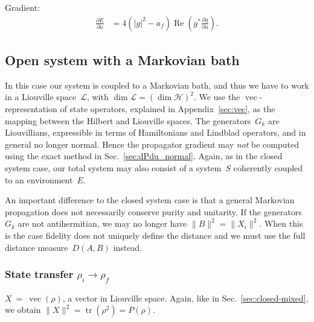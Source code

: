 \documentclass[aps, pra, a4paper, longbibliography, superscriptaddress]{revtex4-1}
\newcommand{\I}{\openone}
\newcommand{\be}{\begin{equation}}
\newcommand{\ee}{\end{equation}}
\newcommand{\eq}{\Leftrightarrow}
\newcommand{\hilb}[1]{\mathcal{#1}}
\DeclareMathOperator{\tr}{tr}
\DeclareMathOperator{\re}{Re}
\DeclareMathOperator{\cvec}{vec}
\newcommand{\dd}[2]{\frac{\partial #1}{\partial #2}}
\begin{document}
Gradient:
\begin{align}
\dd{E}{u}
&=
4 \left(\left|g\right|^2 -a_{f} \right) \re \left(g^* \dd{g}{u}\right).
\end{align}



\subsection{Open system with a Markovian bath}

In this case our system is coupled to a Markovian bath, and thus
we have to work in a Liouville space~$\hilb{L}$,
with $\dim \hilb{L} = (\dim \hilb{H})^2$.
We use the $\cvec$-representation of state
operators, explained in Appendix~\ref{sec:vec},
as the mapping between the Hilbert and Liouville spaces.
The generators~$G_k$ are Liouvillians, expressible in terms of
Hamiltonians and Lindblad operators, and in general no longer normal.
Hence the propagator gradient may \emph{not} be computed using the exact
method in Sec.~\ref{sec:dPdu_normal}.
Again, as in the closed system case, our total system may also consist of
a system~$S$ coherently coupled to an environment~$E$.

An important difference to the closed system case is that a general Markovian propagation
does not necessarily conserve purity and unitarity.
If the generators~$G_k$ are not antihermitian, we may no longer have
$\|B\|^2 = \|X_i\|^2$. When this is the case
fidelity does not uniquely define the distance and we must use the
full distance measure~$D(A,B)$ instead.






\subsubsection{State transfer $\rho_i \to \rho_f$}

$X~=~\cvec(\rho)$, a vector in Liouville space. Again, like in
Sec.~\ref{sec:closed-mixed}, we obtain
$\|X\|^2 = \tr(\rho^2) = P(\rho)$.
\end{document}
